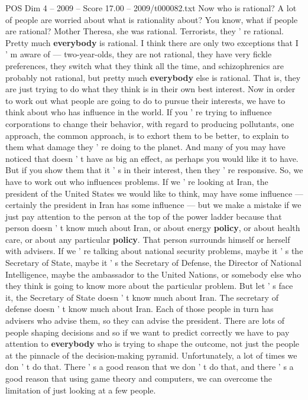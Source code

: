 \begin{textsample}{POS Dim 4 – 2009 – Score 17.00 – 2009/t000082.txt}
Now who is rational?
A lot of people are worried about what is rationality about?
You know, what if people are rational?
Mother Theresa, she was rational.
Terrorists, they ' re rational.
Pretty much \textbf{everybody} is rational.
I think there are only two exceptions that I ' m aware of — two-year-olds, they are not rational, they have very fickle preferences, they switch what they think all the time, and schizophrenics are probably not rational, but pretty much \textbf{everybody} else is rational.
That is, they are just trying to do what they think is in their own best interest.
Now in order to work out what people are going to do to pursue their interests, we have to think about who has influence in the world.
If you ' re trying to influence corporations to change their behavior, with regard to producing pollutants, one approach, the common approach, is to exhort them to be better, to explain to them what damage they ' re doing to the planet.
And many of you may have noticed that doesn ' t have as big an effect, as perhaps you would like it to have.
But if you show them that it ' s in their interest, then they ' re responsive.
So, we have to work out who influences problems.
If we ' re looking at Iran, the president of the United States we would like to think, may have some influence — certainly the president in Iran has some influence — but we make a mistake if we just pay attention to the person at the top of the power ladder because that person doesn ' t know much about Iran, or about energy \textbf{policy}, or about health care, or about any particular \textbf{policy}.
That person surrounds himself or herself with advisers.
If we ' re talking about national security problems, maybe it ' s the Secretary of State, maybe it ' s the Secretary of Defense, the Director of National Intelligence, maybe the ambassador to the United Nations, or somebody else who they think is going to know more about the particular problem.
But let ' s face it, the Secretary of State doesn ' t know much about Iran.
The secretary of defense doesn ' t know much about Iran.
Each of those people in turn has advisers who advise them, so they can advise the president.
There are lots of people shaping decisions and so if we want to predict correctly we have to pay attention to \textbf{everybody} who is trying to shape the outcome, not just the people at the pinnacle of the decision-making pyramid.
Unfortunately, a lot of times we don ' t do that.
There ' s a good reason that we don ' t do that, and there ' s a good reason that using game theory and computers, we can overcome the limitation of just looking at a few people.

\end{textsample}
